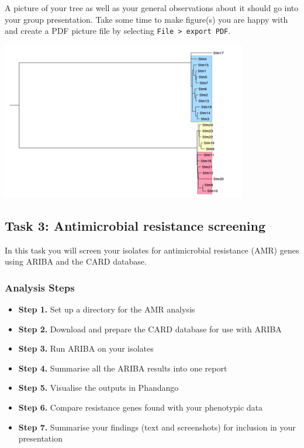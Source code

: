 \documentclass[11pt]{article}
\providecommand{\tightlist}{%
      \setlength{\itemsep}{0pt}\setlength{\parskip}{0pt}}
\begin{document}
A picture of your tree as well as your general observations about it
should go into your group presentation. Take some time to make figure(s)
you are happy with and create a PDF picture file by selecting
\texttt{File\ \textgreater{}\ export\ PDF}.


\begin{center}
\includegraphics[Phylogenetic tree of isolates]{img/tree.png}
\end{center}


    \hypertarget{task-3-antimicrobial-resistance-screening}{%
\subsection{Task 3: Antimicrobial resistance
screening}\label{task-3-antimicrobial-resistance-screening}}

In this task you will screen your isolates for antimicrobial resistance
(AMR) genes using ARIBA and the CARD database.

\hypertarget{analysis-steps}{%
\subsubsection{Analysis Steps}\label{analysis-steps}}

\begin{itemize}
\tightlist
\item
  \textbf{Step 1.} Set up a directory for the AMR analysis
\item
  \textbf{Step 2.} Download and prepare the CARD database for use with
  ARIBA
\item
  \textbf{Step 3.} Run ARIBA on your isolates
\item
  \textbf{Step 4.} Summarise all the ARIBA results into one report
\item
  \textbf{Step 5.} Visualise the outputs in Phandango
\item
  \textbf{Step 6.} Compare resistance genes found with your phenotypic
  data
\item
  \textbf{Step 7.} Summarise your findings (text and screenshots) for
  inclusion in your presentation
\end{itemize}
\end{document}

